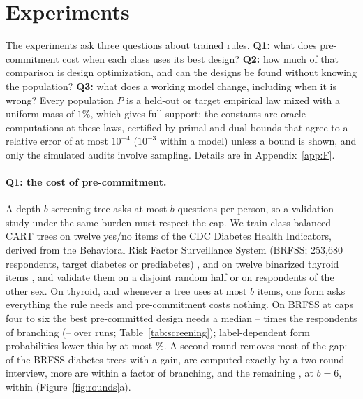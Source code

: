 \section{Experiments}\label{sec:experiments}
The experiments ask three questions about trained rules. \textbf{Q1:} what does pre-commitment cost when each class uses its best design? \textbf{Q2:} how much of that comparison is design optimization, and can the designs be found without knowing the population? \textbf{Q3:} what does a working model change, including when it is wrong? Every population $P$ is a held-out or target empirical law mixed with a uniform mass of $1\%$, which gives full support; the constants are oracle computations at these laws, certified by primal and dual bounds that agree to a relative error of at most $10^{-4}$ ($10^{-3}$ within a model) unless a bound is shown, and only the simulated audits involve sampling. Details are in Appendix~\ref{app:F}.



\paragraph{Q1: the cost of pre-commitment.}
A depth-$b$ screening tree asks at most $b$ questions per person, so a validation study under the same burden must respect the cap. We train class-balanced CART trees on twelve yes/no items of the CDC Diabetes Health Indicators, derived from the Behavioral Risk Factor Surveillance System (BRFSS; 253,680 respondents, target diabetes or prediabetes) \citep{cdcdiabetes2017}, and on twelve binarized thyroid items \citep{quinlan1986thyroid}, and validate them on a disjoint random half or on respondents of the other sex. On thyroid, and whenever a tree uses at most $b$ items, one form asks everything the rule needs and pre-commitment costs nothing. On BRFSS at caps four to six the best pre-committed design needs a median \nScreenBestLo--\nScreenBestHi{} times the respondents of branching (\nScreenRunLo--\nScreenRunHi{} over runs; Table~\ref{tab:screening}); label-dependent form probabilities lower this by at most \nLabelMax\%. \nRulesSentence{} A second round removes most of the gap: of the \nScreenGainN{} BRFSS diabetes trees with a gain, \nGainComputable{} are computed exactly by a two-round interview, \nGainExactNon{} more are within a factor \nScreenTwoMax{} of branching, and the remaining \nTwoBounded, at $b=6$, within \nTwoBoundMax{} (Figure~\ref{fig:rounds}a).



